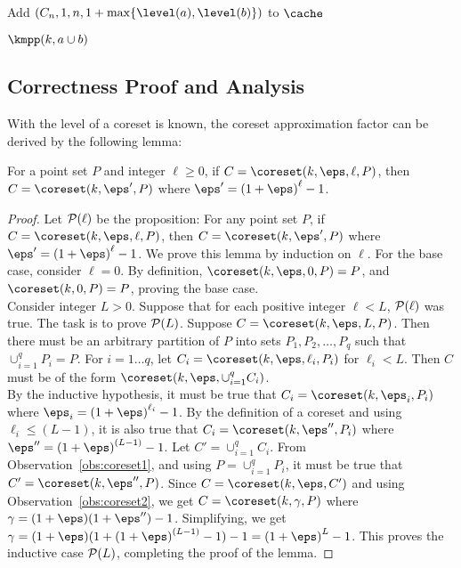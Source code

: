 {\begin{algorithm}
{Add $\left(C_n, 1, n, 1 + \max\{\level(a), \level(b)\} \right)$ to $\cache$\;
}

\Return $\kmpp(k, a \cup b)$\;
\end{algorithm}


\subsection{Correctness Proof and Analysis}

With the level of a coreset is known, the coreset approximation factor can be derived by the following lemma: \\
\begin{lemma}
\label{lemma:level-accuracy}
For a point set $P$ and integer $\ell \ge 0$, if $C = \coreset(k, \eps, \ell, P)$, then $C = \coreset(k, \eps', P)$ where $\eps' = \left(1+\eps \right)^{\ell} - 1$.
\end{lemma}

\begin{proof}
Let ${\cal P}(\ell)$ be the proposition: For any point set $P$, if $C = \coreset(k, \eps, \ell, P)$, then $C = \coreset(k, \eps', P)$ where $\eps' = \left(1+\eps \right)^{\ell} - 1$. We prove this lemma by induction on $\ell$. For the base case, consider $\ell=0$. By definition, $\coreset(k,\eps, 0, P) = P$, and $\coreset(k, 0, P) = P$, proving the base case.\\

Consider integer $L > 0$. Suppose that for each positive integer $\ell < L$,  ${\cal P}(\ell)$ was true. The task is to prove ${\cal P}(L)$. Suppose $C = \coreset(k, \eps, L, P)$. Then there must be an arbitrary partition of $P$ into sets $P_1, P_2, \ldots, P_q$ such that $\cup_{i=1}^q P_i = P$. For $i=1\ldots q$, let $C_i = \coreset(k, \eps, \ell_i, P_i)$ for $\ell_i < L$. Then $C$ must be of the form $\coreset(k, \eps, \cup_{i=1}^q C_i)$. \\

By the inductive hypothesis, it must be true that $C_i=\coreset(k, \eps_i, P_i)$ where $\eps_i = \left(1+\eps \right)^{\ell_i} - 1$. By the definition of a coreset and using $\ell_i \le (L-1)$, it is also true that $C_i = \coreset(k, \eps'', P_i)$ where $\eps'' = \left(1+\eps \right)^{(L-1)} - 1$.  Let $C' = \cup_{i=1}^q C_i$.  From Observation~\ref{obs:coreset1}, and using $P = \cup_{i=1}^q P_i$, it must be true that $C'= \coreset(k, \eps'', P)$. Since $C=\coreset(k,\eps,C')$ and using Observation~\ref{obs:coreset2}, we get  $C=\coreset(k, \gamma, P)$ where $\gamma=(1+\eps)(1+\eps'')-1$. Simplifying, we get $\gamma=(1+\eps)(1+ \left(1+\eps \right)^{(L-1)} - 1)-1 = \left(1+\eps \right )^L - 1$. This proves the inductive case ${\cal P}(L)$, completing the proof of the lemma.
\end{proof}

}
